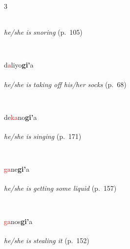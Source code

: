 \documentclass[oneside,openany]{book}%
\begin{document}
\begin{multicols}{3}
\begin{minipage}[t]{\linewidth}
\\
\noindent \textit{he/she is snoring} (p.~105)
\end{minipage}\\[1em]%
\begin{minipage}[t]{\linewidth}
\raggedright\noindent d\textcolor{Red}{a}liyo\textbf{gi'}a\\
\\
\noindent \textit{he/she is taking off his/her socks} (p.~68)
\end{minipage}\\[1em]%
\begin{minipage}[t]{\linewidth}
\raggedright\noindent de\textcolor{Red}{ka}no\textbf{gi'}a\\
\\
\noindent \textit{he/she is singing} (p.~171)
\end{minipage}\\[1em]%
\begin{minipage}[t]{\linewidth}
\raggedright\noindent \textcolor{Red}{ga}ne\textbf{gi'}a\\
\\
\noindent \textit{he/she is getting some liquid} (p.~157)
\end{minipage}\\[1em]%
\begin{minipage}[t]{\linewidth}
\raggedright\noindent \textcolor{Red}{ga}nos\textbf{gi'}a\\
\\
\noindent \textit{he/she is stealing it} (p.~152)
\end{minipage}\\[1em]%
\end{multicols}%
\vspace{1em}%
\needspace{1.5in}%
\end{document}
